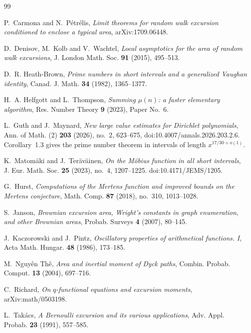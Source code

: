 \documentclass[11pt]{amsart}
\numberwithin{equation}{section}
\theoremstyle{plain}
\theoremstyle{definition}
\theoremstyle{remark}
\begin{document}
\begin{thebibliography}{99}


P.~Carmona and N.~P\'etr\'elis, \emph{Limit theorems for random walk excursion
conditioned to enclose a typical area}, arXiv:1709.06448.

D.~Denisov, M.~Kolb and V.~Wachtel, \emph{Local asymptotics for the area of
random walk excursions}, J. London Math. Soc. \textbf{91} (2015), 495--513.

D.~R. Heath-Brown, \emph{Prime numbers in short intervals and a generalized
Vaughan identity}, Canad. J. Math. \textbf{34} (1982), 1365--1377.

H.~A. Helfgott and L.~Thompson, \emph{Summing $\mu(n)$: a faster elementary
algorithm}, Res. Number Theory \textbf{9} (2023), Paper No.~6.

L.~Guth and J.~Maynard, \emph{New large value estimates for Dirichlet
polynomials}, Ann. of Math. (2) \textbf{203} (2026), no.~2, 623--675,
doi:10.4007/annals.2026.203.2.6. Corollary~1.3 gives the prime number
theorem in intervals of length $x^{17/30+o(1)}$.

K.~Matom\"aki and J.~Ter\"av\"ainen, \emph{On the M\"obius function in
all short intervals}, J. Eur. Math. Soc. \textbf{25} (2023), no.~4,
1207--1225. doi:10.4171/JEMS/1205.

G.~Hurst, \emph{Computations of the Mertens function and improved bounds on
the Mertens conjecture}, Math. Comp. \textbf{87} (2018), no.~310, 1013--1028.

S.~Janson, \emph{Brownian excursion area, Wright's constants in graph
enumeration, and other Brownian areas}, Probab. Surveys \textbf{4} (2007),
80--145.

J.~Kaczorowski and J.~Pintz, \emph{Oscillatory properties of arithmetical
functions. I}, Acta Math. Hungar. \textbf{48} (1986), 173--185.

M.~Nguy\^en Th\^e, \emph{Area and inertial moment of Dyck paths}, Combin.
Probab. Comput. \textbf{13} (2004), 697--716.

C.~Richard, \emph{On $q$-functional equations and excursion moments},
arXiv:math/0503198.

L.~Tak\'acs, \emph{A Bernoulli excursion and its various applications},
Adv. Appl. Probab. \textbf{23} (1991), 557--585.


\end{thebibliography}
\end{document}
